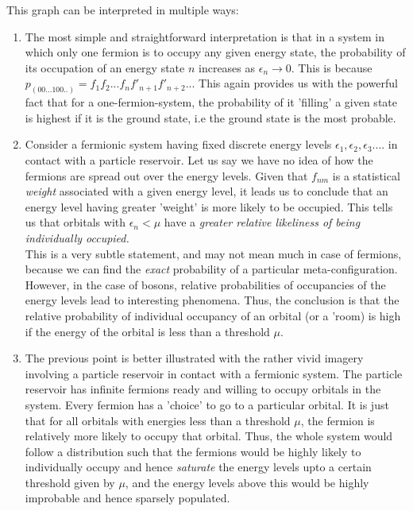 \documentclass[oneside]{book}
\begin{document}
This graph can be interpreted in multiple ways:
\begin{enumerate}
\item The most simple and straightforward interpretation is that in a system in which only one fermion is to occupy any given energy state, the probability of its occupation of an energy state $n$ increases as $\epsilon_n \rightarrow 0$. This is because $p_{(00...100..)} = f_{1}f_{2}...f_{n}f'_{n+1}f'_{n+2}...$ This again provides us with the powerful fact that for a one-fermion-system, the probability of it 'filling' a given state is highest if it is the ground state, i.e the ground state is the most probable.

\item Consider a fermionic system having fixed discrete energy levels $\epsilon_1,\epsilon_2,\epsilon_3....$ in contact with a particle reservoir. Let us say we have no idea of how the fermions are spread out over the energy levels. Given that $f_{nm}$ is a statistical \emph{weight} associated with a given energy level, it leads us to conclude that an energy level having greater 'weight' is more likely to be occupied. This tells us that orbitals with $\epsilon_n < \mu$ have a \emph{greater relative likeliness of being individually occupied.}\\
 This is a very subtle statement, and may not mean much in case of fermions, because we can find the \emph{exact} probability of a particular meta-configuration. However, in the case of bosons, relative probabilities of occupancies of the energy levels lead to interesting phenomena. Thus, the conclusion is that the relative probability of individual occupancy of an orbital (or a 'room) is high if the energy of the orbital is less than a threshold $\mu$.
\item The previous point is better illustrated with the rather vivid imagery involving a particle reservoir in contact with a fermionic system. The particle reservoir has infinite fermions ready and willing to occupy orbitals in the system. Every fermion has a 'choice' to go to a particular orbital. It is just that for all orbitals with energies less than a threshold $\mu$, the fermion is relatively more likely to occupy that orbital. Thus, the whole system would follow a distribution such that the fermions would be highly likely to individually occupy and hence \emph{saturate} the energy levels upto a certain threshold given by 
$\mu$, and the energy  levels above this would be highly improbable and hence sparsely populated.
\end{enumerate}
\end{document}
